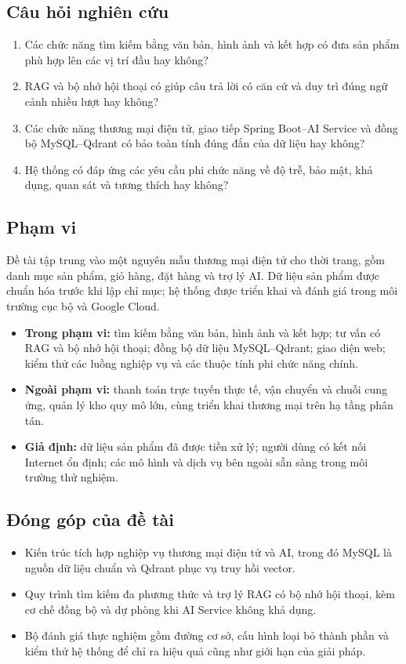 \subsection{Câu hỏi nghiên cứu}
\begin{enumerate}
    \item Các chức năng tìm kiếm bằng văn bản, hình ảnh và kết hợp có đưa sản phẩm phù hợp lên các vị trí đầu hay không?
    \item RAG và bộ nhớ hội thoại có giúp câu trả lời có căn cứ và duy trì đúng ngữ cảnh nhiều lượt hay không?
    \item Các chức năng thương mại điện tử, giao tiếp Spring Boot--AI Service và đồng bộ MySQL--Qdrant có bảo toàn tính đúng đắn của dữ liệu hay không?
    \item Hệ thống có đáp ứng các yêu cầu phi chức năng về độ trễ, bảo mật, khả dụng, quan sát và tương thích hay không?
\end{enumerate}

\subsection{Phạm vi}
\indent Đề tài tập trung vào một nguyên mẫu thương mại điện tử cho thời trang, gồm danh mục sản phẩm, giỏ hàng, đặt hàng và trợ lý AI. Dữ liệu sản phẩm được chuẩn hóa trước khi lập chỉ mục; hệ thống được triển khai và đánh giá trong môi trường cục bộ và Google Cloud.

\begin{itemize}
    \item \textbf{Trong phạm vi:} tìm kiếm bằng văn bản, hình ảnh và kết hợp; tư vấn có RAG và bộ nhớ hội thoại; đồng bộ dữ liệu MySQL--Qdrant; giao diện web; kiểm thử các luồng nghiệp vụ và các thuộc tính phi chức năng chính.
    \item \textbf{Ngoài phạm vi:} thanh toán trực tuyến thực tế, vận chuyển và chuỗi cung ứng, quản lý kho quy mô lớn, cùng triển khai thương mại trên hạ tầng phân tán.
    \item \textbf{Giả định:} dữ liệu sản phẩm đã được tiền xử lý; người dùng có kết nối Internet ổn định; các mô hình và dịch vụ bên ngoài sẵn sàng trong môi trường thử nghiệm.
\end{itemize}

\subsection{Đóng góp của đề tài}
\begin{itemize}
    \item Kiến trúc tích hợp nghiệp vụ thương mại điện tử và AI, trong đó MySQL là nguồn dữ liệu chuẩn và Qdrant phục vụ truy hồi vector.
    \item Quy trình tìm kiếm đa phương thức và trợ lý RAG có bộ nhớ hội thoại, kèm cơ chế đồng bộ và dự phòng khi AI Service không khả dụng.
    \item Bộ đánh giá thực nghiệm gồm đường cơ sở, cấu hình loại bỏ thành phần và kiểm thử hệ thống để chỉ ra hiệu quả cũng như giới hạn của giải pháp.
\end{itemize}

